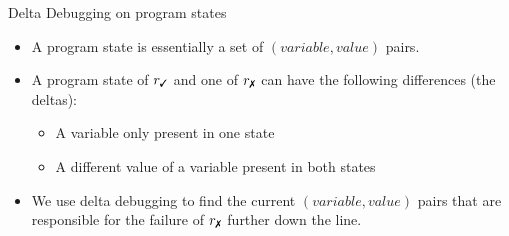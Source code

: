 \begin{frame}{Delta Debugging on program states}
	\begin{itemize}
		\item A program state is essentially a set of $(variable, value)$ pairs.
		\item A program state of $r_\cmark$ and one of $r_\xmark$ can have the following differences (the deltas): \begin{itemize}
			\item A variable only present in one state
			\item A different value of a variable present in both states
		\end{itemize}
		\item We use delta debugging to find the current $(variable, value)$ pairs that are responsible for the failure of $r_\xmark$ further down the line.
	\end{itemize}


\end{frame}

\newcommand{\cecarrow}{\to}

